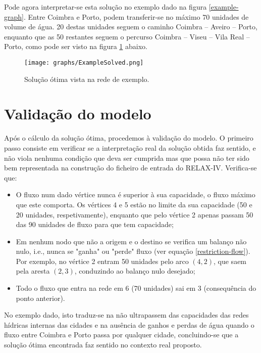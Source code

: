 \documentclass[12pt, a4paper, titlepage]{article}
\begin{document}
Pode agora interpretar-se esta solução no exemplo dado na figura \ref{example-graph}. Entre Coimbra
e Porto, podem transferir-se no máximo 70 unidades de volume de água. 20 destas unidades seguem o
caminho Coimbra -- Aveiro -- Porto, enquanto que as 50 restantes seguem o percurso Coimbra -- Viseu
-- Vila Real -- Porto, como pode ser visto na figura \ref{example-solved} abaixo.

\begin{figure}[H]
    \centering
    \texttt{[image: graphs/ExampleSolved.png]}
    \caption{Solução ótima vista na rede de exemplo.}
    \label{example-solved}
\end{figure}

\section{Validação do modelo}

Após o cálculo da solução ótima, procedemos à validação do modelo. O primeiro passo consiste em
verificar se a interpretação real da solução obtida faz sentido, e não viola nenhuma condição que
deva ser cumprida mas que possa não ter sido bem representada na construção do ficheiro de entrada
do RELAX-IV. Verifica-se que:

\begin{itemize}
    \item O fluxo num dado vértice nunca é superior à sua capacidade, o fluxo máximo que este
        comporta. Os vértices 4 e 5 estão no limite da sua capacidade (50 e 20 unidades,
        respetivamente), enquanto que pelo vértice 2 apenas passam 50 das 90 unidades de fluxo para
        que tem capacidade;
    \item Em nenhum nodo que não a origem e o destino se verifica um balanço não nulo, i.e., nunca
        se "ganha"{} ou "perde"{} fluxo (ver equação \ref{restriction-flow}). Por exemplo, no
        vértice 2 entram 50 unidades pelo arco $(4, 2)$, que saem pela aresta $(2, 3)$, conduzindo
        ao balanço nulo desejado;
    \item Todo o fluxo que entra na rede em 6 (70 unidades) sai em 3 (consequência do ponto
        anterior).
\end{itemize}

No exemplo dado, isto traduz-se na não ultrapassem das capacidades das redes hídricas internas das
cidades e na ausência de ganhos e perdas de água quando o fluxo entre Coimbra e Porto passa por
qualquer cidade, concluindo-se que a solução ótima encontrada faz sentido no contexto real proposto.
\end{document}
